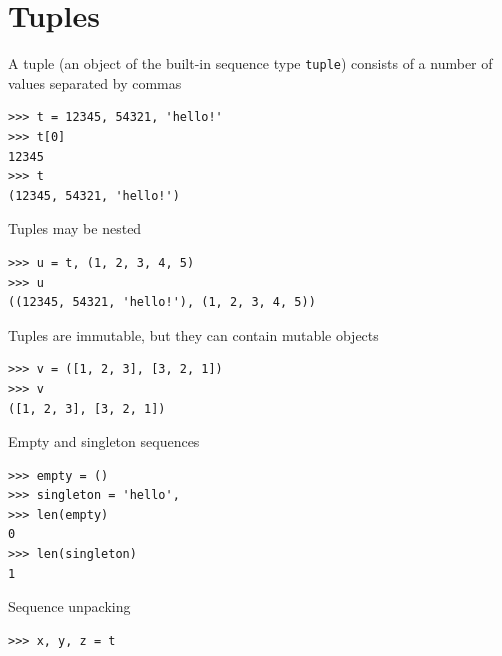 \documentclass[8pt,a4paper,compress]{beamer}
\begin{document}
\section{Tuples}
\begin{frame}[fragile]
\pause

A tuple (an object of the built-in sequence type \lstinline{tuple}) consists of a number of values separated by commas
\begin{lstlisting}[language={}]
>>> t = 12345, 54321, 'hello!'
>>> t[0]
12345
>>> t
(12345, 54321, 'hello!')
\end{lstlisting}

\pause
\bigskip

Tuples may be nested
\begin{lstlisting}[language={}]
>>> u = t, (1, 2, 3, 4, 5)
>>> u
((12345, 54321, 'hello!'), (1, 2, 3, 4, 5))
\end{lstlisting}

\pause
\bigskip

Tuples are immutable, but they can contain mutable objects
\begin{lstlisting}[language={}]
>>> v = ([1, 2, 3], [3, 2, 1])
>>> v
([1, 2, 3], [3, 2, 1])
\end{lstlisting}

\pause
\bigskip

Empty and singleton sequences
\begin{lstlisting}[language={}]
>>> empty = ()
>>> singleton = 'hello', 
>>> len(empty)
0
>>> len(singleton)
1
\end{lstlisting}

\pause
\bigskip

Sequence unpacking
\begin{lstlisting}[language={}]
>>> x, y, z = t
\end{lstlisting}
\end{frame}
\end{document}
